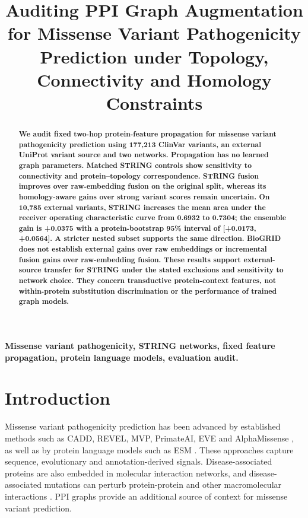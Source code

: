 \documentclass[conference]{IEEEtran}
\title{Auditing PPI Graph Augmentation for Missense Variant Pathogenicity Prediction under Topology, Connectivity and Homology Constraints}
\author{}
\begin{document}
\maketitle


\begin{abstract}
\bfseries\boldmath
We audit fixed two-hop protein-feature propagation for missense variant pathogenicity prediction using 177,213 ClinVar variants, an external UniProt variant source and two networks. Propagation has no learned graph parameters. Matched STRING controls show sensitivity to connectivity and protein--topology correspondence. STRING fusion improves over raw-embedding fusion on the original split, whereas its homology-aware gains over strong variant scores remain uncertain. On 10,785 external variants, STRING increases the mean area under the receiver operating characteristic curve from 0.6932 to 0.7304; the ensemble gain is +0.0375 with a protein-bootstrap 95\% interval of [+0.0173, +0.0564]. A stricter nested subset supports the same direction. BioGRID does not establish external gains over raw embeddings or incremental fusion gains over raw-embedding fusion. These results support external-source transfer for STRING under the stated exclusions and sensitivity to network choice. They concern transductive protein-context features, not within-protein substitution discrimination or the performance of trained graph models.

\end{abstract}

\begin{IEEEkeywords}
\bfseries\boldmath
Missense variant pathogenicity, STRING networks, fixed feature propagation, protein language models, evaluation audit.
\end{IEEEkeywords}

\section{Introduction}

Missense variant pathogenicity prediction has been advanced by established methods such as CADD, REVEL, MVP, PrimateAI, EVE and AlphaMissense \cite{Kircher2014CADD,Ioannidis2016REVEL,Qi2021MVP,Sundaram2018PrimateAI,Frazer2021EVE,Cheng2023AlphaMissense}, as well as by protein language models such as ESM \cite{Lin2023ESM}. These approaches capture sequence, evolutionary and annotation-derived signals. Disease-associated proteins are also embedded in molecular interaction networks, and disease-associated mutations can perturb protein-protein and other macromolecular interactions \cite{Barabasi2011NetworkMedicine,Menche2015DiseaseModules,Sahni2015InteractionPerturbation,Chen2018InteractomePerturbation}. PPI graphs provide an additional source of context for missense variant prediction.
\end{document}

